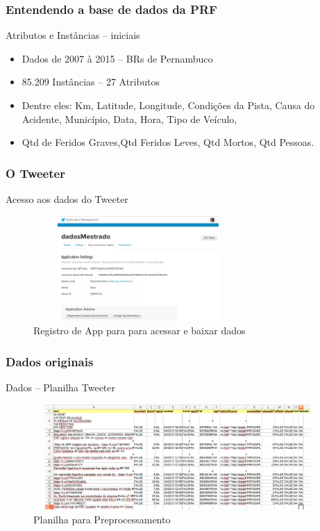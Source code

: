 \documentclass[11pt]{beamer}
\begin{document}
\begin{frame}\frametitle{ Entendendo a base de dados da PRF}
	
	\begin{exampleblock}{ Atributos e Instâncias -- iniciais}
		\begin{itemize}
			\item Dados de 2007 à 2015 -- BRs de Pernambuco
			\pause
			\item 85.209 Instâncias -- 27 Atributos
			\pause
			\item Dentre eles: Km, Latitude, Longitude, Condições da Pista, Causa do Acidente, Município, Data, Hora, Tipo de Veículo, 
			\pause
			\item Qtd de Feridos Graves,Qtd Feridos Leves, Qtd Mortos, Qtd Pessoas.
			
		\end{itemize}
	\end{exampleblock}
\end{frame}


\begin{frame}\frametitle{ O Tweeter}
	\begin{block}{ Acesso aos dados do Tweeter}
		\begin{figure}[!ht]
			\centering %
			\caption{Registro de App para para acessar e baixar dados}
			\includegraphics[width=80mm, height=40mm]{Figuras/BigData/appTweeter.png}
		\end{figure}
	\end{block}
\end{frame}


\begin{frame}\frametitle{ Dados originais}
\transblindshorizontal[duration=2, direction=25]
	\begin{block}{ Dados -- Planilha Tweeter}
		\begin{figure}[!ht]
			\centering %
			\caption{Planilha para Preprocessamento}
			\includegraphics[width=110mm, height=40mm]{Figuras/BigData/tweetPRF.png}
		\end{figure}
	\end{block}
\end{frame}
\end{document}
